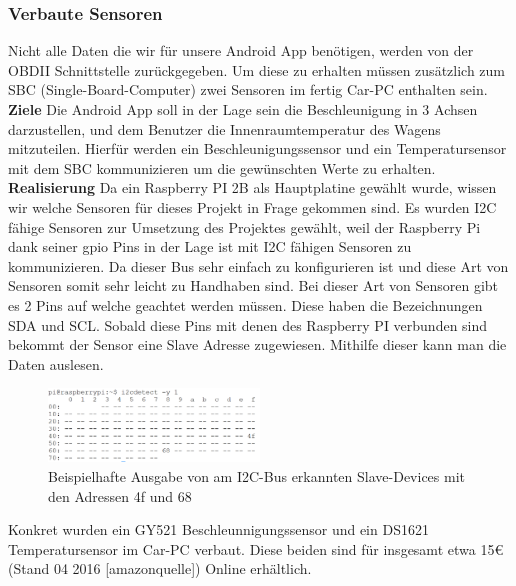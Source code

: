 \subsubsection{Verbaute Sensoren}
Nicht alle Daten die wir für unsere Android App benötigen, werden von der OBDII Schnittstelle
zurückgegeben. Um diese zu erhalten müssen zusätzlich zum SBC (Single-Board-Computer) zwei Sensoren im fertig Car-PC enthalten sein.
\newline
\textbf{Ziele\newline}
Die Android App soll in der Lage sein die Beschleunigung in 3 Achsen darzustellen, und dem Benutzer
die Innenraumtemperatur des Wagens mitzuteilen.
Hierfür werden ein Beschleunigungssensor und ein Temperatursensor mit dem SBC kommunizieren
um die gewünschten Werte zu erhalten.
\newline
\textbf{Realisierung\newline}
Da ein Raspberry PI 2B als Hauptplatine gewählt wurde, wissen wir welche Sensoren für dieses Projekt in Frage gekommen sind.
\newline
Es wurden I2C fähige Sensoren zur Umsetzung des Projektes gewählt, weil der Raspberry Pi dank seiner gpio Pins in der Lage ist mit I2C fähigen Sensoren zu kommunizieren. Da dieser Bus sehr einfach zu konfigurieren ist und diese Art von Sensoren somit sehr leicht zu Handhaben sind.
Bei dieser Art von Sensoren gibt es 2 Pins auf welche geachtet werden müssen. Diese haben die Bezeichnungen SDA und SCL. Sobald diese Pins mit denen des Raspberry PI verbunden sind bekommt der Sensor eine Slave Adresse zugewiesen. Mithilfe dieser kann man die Daten auslesen.
\begin{figure}[!htb]\centering
	\includegraphics[width=0.5\textwidth]{images/sensorendetect}
	\caption{Beispielhafte Ausgabe von am I2C-Bus erkannten Slave-Devices mit den Adressen 4f und 68}\label{Fig:imgSensorDetect}
\end{figure}

Konkret wurden ein GY521 Beschleunnigungssensor und ein DS1621 Temperatursensor im Car-PC verbaut. Diese beiden sind für insgesamt etwa 15€ (Stand 04 2016 [amazonquelle]) Online erhältlich.

